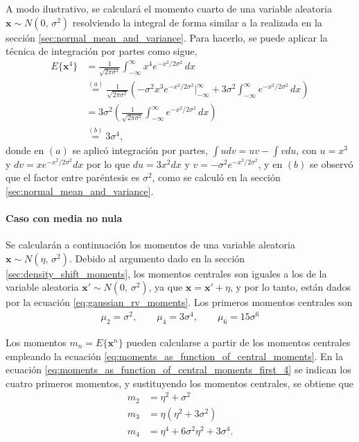 \documentclass[a4paper]{report}
\newcommand{\x}{\mathbf{x}}
\begin{document}
A modo ilustrativo, se calculará el momento cuarto de una variable aleatoria \(\x\sim N(0,\,\sigma^2)\) resolviendo la integral de forma similar a la realizada en la sección \ref{sec:normal_mean_and_variance}. Para hacerlo, se puede aplicar la técnica de integración por partes como sigue,
\begin{align*}
 E\{\x^4\}&=\frac{1}{\sqrt{2\pi\sigma^2}}\int_{-\infty}^{\infty} x^4e^{-x^2/2\sigma^2}\,dx\\
 &\overset{(a)}{=}\frac{1}{\sqrt{2\pi\sigma^2}}\left(-\sigma^2x^3e^{-x^2/2\sigma^2}\bigg|_{-\infty}^{\infty} +3\sigma^2\int_{-\infty}^{\infty}e^{-x^2/2\sigma^2}\,dx\right)\\
 &=3\sigma^2\left(\frac{1}{\sqrt{2\pi\sigma^2}}\int_{-\infty}^{\infty}e^{-x^2/2\sigma^2}\,dx\right)\\
 &\overset{(b)}{=}3\sigma^4,
\end{align*}
donde en \((a)\) se aplicó integración por partes, \(\int udv=uv-\int vdu\), con \(u=x^3\) y \(dv=xe^{-x^2/2\sigma^2}dx\) por lo que \(du=3x^2dx\) y \(v=-\sigma^2e^{-x^2/2\sigma^2}\), y en \((b)\) se observó que el factor entre paréntesis es \(\sigma^2\), como se calculó en la sección \ref{sec:normal_mean_and_variance}.


\paragraph{Caso con media no nula} 

Se calcularán a continuación los momentos de una variable aleatoria \(\x\sim N(\eta,\,\sigma^2)\). Debido al argumento dado en la sección \ref{sec:density_shift_moments}, los momentos centrales son iguales a los de la variable aleatoria \(\x'\sim N(0,\,\sigma^2)\), ya que \(\x=\x'+\eta\), y por lo tanto, están dados por la ecuación \ref{eq:gaussian_rv_moments}. Los primeros momentos centrales son
\begin{align*}
 \mu_2=\sigma^2,\qquad\mu_4=3\sigma^4,\qquad\mu_6=15\sigma^6
\end{align*}

Los momentos \(m_n=E\{\x^n\}\) pueden calcularse a partir de los momentos centrales empleando la ecuación \ref{eq:moments_as_function_of_central_moments}. En la ecuación \ref{eq:moments_as_function_of_central_moments_first_4} se indican los cuatro primeros momentos, y sustituyendo los momentos centrales, se obtiene que
\begin{equation}\label{eq:normal_rv_moments}
 \begin{aligned}
 m_2&=\eta^2+\sigma^2\\
 m_3&=\eta(\eta^2+3\sigma^2)\\
 m_4&=\eta^4+6\sigma^2\eta^2+3\sigma^4.
\end{aligned}
\end{equation}
\end{document}
